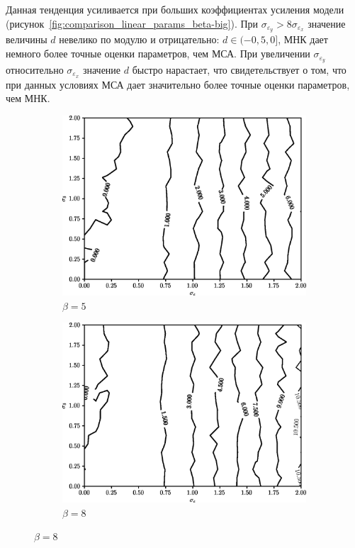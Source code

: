 Данная тенденция усиливается при больших коэффициентах усиления модели
(рисунок~\ref{fig:comparison_linear_params_beta-big}).
При \( \sigma_{\varepsilon_y} > 8\sigma_{\varepsilon_x} \)
значение величины \( d \) невелико по модулю и отрицательно: \( d \in ( -0{,}5, 0 ] \),
МНК дает немного более точные оценки параметров, чем МСА.
При увеличении \( \sigma_{\varepsilon_y} \) относительно \( \sigma_{\varepsilon_x} \) значение
\( d \) быстро нарастает, что свидетельствует о том,
что при данных условиях МСА дает значительно более точные оценки параметров, чем МНК.

\begin{figure}[p]
  \begin{subfigure}[b]{\linewidth}
    \centering
    \includegraphics[width=135mm]{fig/linear/param/beta-5_param}
    \caption{\( \beta = 5 \)}
  \end{subfigure}

  \vspace{2\baselineskip}
  \begin{subfigure}[b]{\linewidth}
    \centering
    \includegraphics[width=135mm]{fig/linear/param/beta-8_param}
    \caption{\( \beta = 8 \)}
  \end{subfigure}


\end{figure}
